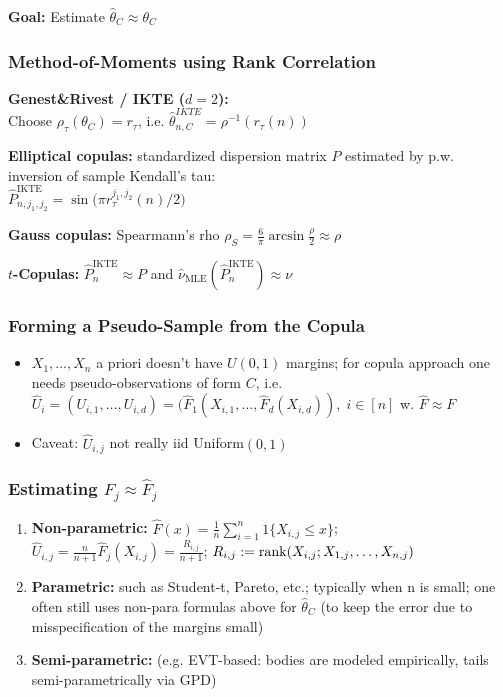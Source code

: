 \textbf{Goal:} Estimate $\hat \theta_C\approx \theta_C$

\subsubsection*{Method-of-Moments using Rank Correlation}

\textbf{Genest\&Rivest / IKTE ($d=2$):}\\
Choose $\rho_\tau(\theta_C)=r_\tau$, i.e. $\hat \theta^{IKTE}_{n,C}=\rho^{-1}(r_\tau(n))$

\textbf{Elliptical copulas:} standardized dispersion matrix $P$ estimated by p.w. inversion of sample Kendall’s tau:\\
$\hat P^{\text{IKTE}}_{n,j_1,j_2}=\sin\big(\pi r^{j_1,j_2}_{\tau}(n)/2\big)$

\textbf{Gauss copulas:} Spearmann's rho $\rho_S = \frac{6}{\pi} \arcsin \frac{\rho}{2} \approx \rho$

\textbf{$t$-Copulas:} $\hat P^{\text{IKTE}}_{n}\approx P$ and $\hat\nu_{\text{MLE}}(\hat P^{\text{IKTE}}_n)\approx \nu$

\subsubsection*{Forming a Pseudo-Sample from the Copula}

\begin{itemize}
    \item $X_1,\dots,X_n$ a priori doesn't have $U(0,1)$ margins; for copula approach one needs pseudo-observations of form $C$, i.e. 
    $\hat U_i=(U_{i,1},\dots,U_{i,d})=(\hat F_1(X_{i,1},\dots,\hat F_d(X_{i,d})),\; i\in[n]$ w. $\hat F\approx F$
    \item Caveat: $\hat U_{i,j}$ not really iid Uniform$(0,1)$
\end{itemize}

\subsubsection*{Estimating $F_j\approx \hat F_j$}
\begin{enumerate}
    \item \textbf{Non-parametric:} $\hat F(x)=\frac{1}{n}\sum^n_{i=1} 1\{X_{i,j}\leq x\}$;\\
    $\hat U_{i,j}=\frac{n}{n+1}\hat F_j(X_{i,j})=\frac{R_{i,j}}{n+1}$; $R_{i,j}:=\operatorname{rank} (X_{i,j}; X_{1,j},\dots,X_{n,j})$
    \item \textbf{Parametric:} such as Student-t, Pareto, etc.; typically when n is small; one often still uses non-para formulas above for $\hat \theta_C$ (to keep the error due to misspecification of the margins small)
    \item \textbf{Semi-parametric:}  (e.g. EVT-based: bodies are modeled empirically, tails semi-parametrically via GPD)
\end{enumerate}

